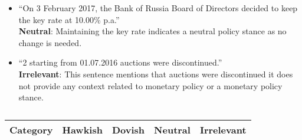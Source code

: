 \begin{itemize}
    \item ``On 3 February 2017, the Bank of Russia Board of Directors decided to keep the key rate at 10.00\% p.a.''\\
    \textbf{Neutral}: Maintaining the key rate indicates a neutral policy stance as no change is needed. 

    \item ``2 starting from 01.07.2016 auctions were discontinued.''\\
    \textbf{Irrelevant}: This sentence mentions that auctions were discontinued it does not provide any context related to monetary policy or a monetary policy stance.
\end{itemize}

\newpage

\begin{longtable}{p{}p{}p{}p{}p{}}
\caption{} \label{tb:cbr_mp_stance_guide}\\
\toprule
\textbf{Category} & \textbf{Hawkish} & \textbf{Dovish} & \textbf{Neutral} & \textbf{Irrelevant} \\
\midrule
\endfirsthead


\end{longtable}

